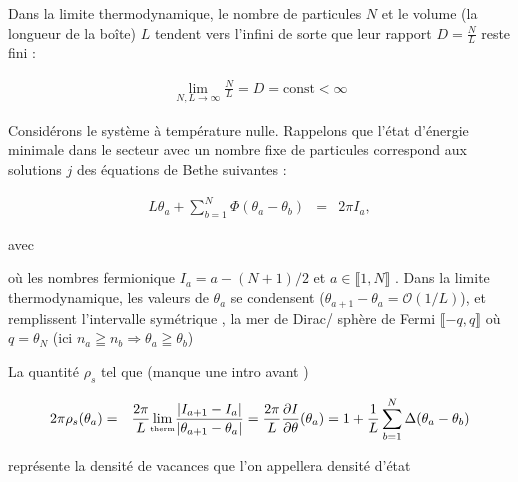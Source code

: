 Dans la limite thermodynamique, le nombre de particules \( N \) et le volume 
(la longueur de la boîte) \( L \) tendent vers l'infini de sorte que leur rapport 
\( D = \frac{N}{L} \) reste fini :

\begin{eqnarray*}
	\lim_{N, L \to \infty} \frac{N}{L} = D = \mbox{const} < \infty	
\end{eqnarray*}

Considérons le système à température nulle. Rappelons que l'état 
d'énergie minimale dans le secteur avec un nombre fixe de particules 
correspond aux solutions \( j \) des équations de Bethe suivantes :

\begin{eqnarray*}
	L \theta_a + \sum_{b = 1}^N \Phi ( \theta_a - \theta_b ) & = & 2\pi I_a ,	
\end{eqnarray*}

avec 

où les nombres fermionique $I_a = a - (N+1)/2$ et $a \in \llbracket 1 , N  \rrbracket$ . Dans la limite thermodynamique, les valeurs de \( \theta_a \) se condensent (\(\theta_{a+1} - \theta_a = \mathcal{O}(1/L)\)), et remplissent l'intervalle symétrique , la mer de Dirac/ sphère de Fermi  \(\llbracket-q, q\rrbracket\) où $q = \theta_N$ (ici $n_a \geqq n_b \Rightarrow \theta_a \geqq \theta_b$)

La quantité $\rho_s$ tel que (manque une intro avant ) 

\begin{eqnarray*}
	2\pi \rho_s (\theta_a) & = & \frac{2\pi}{L}\underset{\tiny \mbox{therm}}{\lim} \frac{ \vert I_{a+1} - I_{a} \vert}{ \vert \theta_{a+1} - \theta_a \vert} = \frac{2\pi}{L} \frac{ \partial I}{\partial \theta } ( \theta_a ) = 1 	+ \frac{1}{L}\sum_{b = 1}^N \Delta (\theta_a - \theta_b)
\end{eqnarray*}

représente la densité de vacances que l'on appellera densité d'état

 



